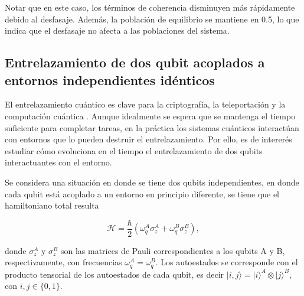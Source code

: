 Notar que en este caso, los términos de coherencia disminuyen más rápidamente debido al desfasaje. Además, la población de equilibrio se mantiene en 0.5, lo que indica que el desfasaje no afecta a las poblaciones del sistema.


\subsection{Entrelazamiento de dos qubit acoplados a entornos independientes idénticos} \label{sec: two_qubits}

El entrelazamiento cuántico es clave para la criptografía, la teleportación y la computación cuántica \cite{ESD,Wootters}. Aunque idealmente se espera que se mantenga el tiempo suficiente para completar tareas, en la práctica los sistemas cuánticos interactúan con entornos que lo pueden destruir el entrelazamiento. Por ello, es de intererés estudiar cómo evoluciona en el tiempo el entrelazamiento de dos qubits interactuantes con el entorno.

Se considera una situación en donde se tiene dos qubits independientes, en donde cada qubit está acoplado a un entorno en principio diferente, se tiene que el hamiltoniano total resulta


\begin{equation} \label{eq: h_two_qubits}
    \mathcal{H} = \frac{\hbar}{2} \left( \omega_q^{A} \sigma_z^{A} + \omega_q^{B}\sigma_z^{B} \right),
\end{equation}

\noindent donde \(\sigma_z^{A}\) y \(\sigma_z^{B}\) son las matrices de Pauli correspondientes a los qubits A y B, respectivamente, con frecuencias \(\omega_q^{A} = \omega_q^{B}\). Los autoestados se corresponde con el producto tensorial de los autoestados de cada qubit, es decir \(|i,j\rangle = |i\rangle^{A} \otimes |j\rangle^{B}\), con \(i,j \in \{0,1\}\). 


